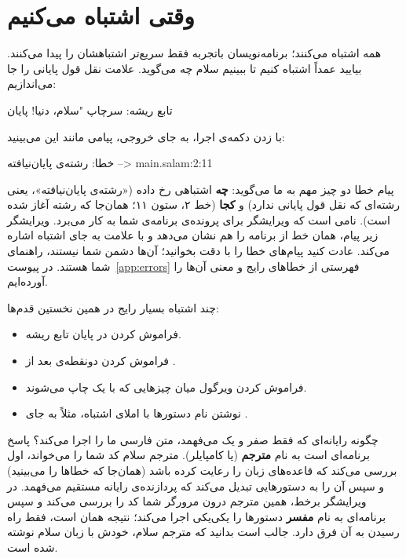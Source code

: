 \section{وقتی اشتباه می‌کنیم}

همه اشتباه می‌کنند؛ برنامه‌نویسان باتجربه فقط سریع‌تر اشتباهشان را پیدا
می‌کنند. بیایید عمداً اشتباه کنیم تا ببینیم سلام چه می‌گوید. علامت نقل قول
پایانی را جا می‌اندازیم:

\begin{salamfa}
تابع ریشه:
    سرچاپ "سلام، دنیا!
پایان
\end{salamfa}

با زدن دکمه‌ی اجرا، به جای خروجی، پیامی مانند این می‌بینید:

\begin{outputfa}
خطا: رشته‌ی پایان‌نیافته
 --> main.salam:2:11
\end{outputfa}

پیام خطا دو چیز مهم به ما می‌گوید: \textbf{چه} اشتباهی رخ داده («رشته‌ی
پایان‌نیافته»، یعنی رشته‌ای که نقل قول پایانی ندارد) و \textbf{کجا}
(خط ۲، ستون ۱۱؛ همان‌جا که رشته آغاز شده است).  نامی است
که ویرایشگر برای پرونده‌ی برنامه‌ی شما به کار می‌برد. ویرایشگر زیر پیام، همان
خط از برنامه را هم نشان می‌دهد و با علامت \code{\textasciicircum} به جای
اشتباه اشاره می‌کند. عادت کنید پیام‌های خطا را با دقت بخوانید؛ آن‌ها دشمن شما نیستند،
راهنمای شما هستند. در پیوست~\ref{app:errors} فهرستی از خطاهای رایج و معنی
آن‌ها را آورده‌ایم.

چند اشتباه بسیار رایج در همین نخستین قدم‌ها:
\begin{itemize}
  \item فراموش کردن  در پایان تابع ریشه.
  \item فراموش کردن دونقطه‌ی بعد از .
  \item فراموش کردن ویرگول میان چیزهایی که با یک  چاپ می‌شوند.
  \item نوشتن نام دستورها با املای اشتباه، مثلاً  به جای
        .
\end{itemize}

\begin{deep}
چگونه رایانه‌ای که فقط صفر و یک می‌فهمد، متن فارسی ما را اجرا می‌کند؟
پاسخ برنامه‌ای است به نام \textbf{مترجم} (یا کامپایلر). مترجم سلام کد شما
را می‌خواند، اول بررسی می‌کند که قاعده‌های زبان را رعایت کرده باشد (همان‌جا
که خطاها را می‌بینید) و سپس آن را به دستورهایی تبدیل می‌کند که پردازنده‌ی
رایانه مستقیم می‌فهمد. در ویرایشگر برخط، همین مترجم درون مرورگر شما کد را
بررسی می‌کند و سپس برنامه‌ای به نام \textbf{مفسر} دستورها را یکی‌یکی اجرا
می‌کند؛ نتیجه همان است، فقط راه رسیدن به آن فرق دارد. جالب است بدانید که مترجم سلام، خودش با زبان سلام نوشته شده است.
\end{deep}

